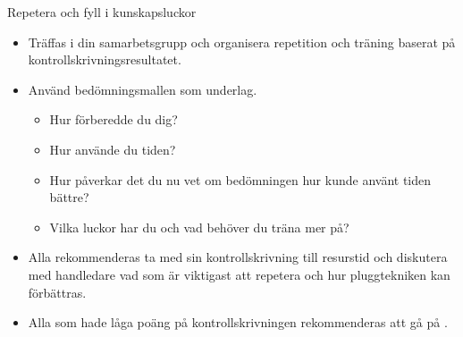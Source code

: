 \begin{Slide}{Repetera och fyll i kunskapsluckor}

\begin{itemize}
  \item
  Träffas i din samarbetsgrupp och organisera repetition och träning baserat på kontrollskrivningsresultatet.
    \item Använd bedömningsmallen som underlag.

  \begin{itemize}
    \item Hur förberedde du dig?
    \item Hur använde du tiden?
    \item Hur påverkar det du nu vet om bedömningen hur kunde använt tiden bättre?
    \item Vilka luckor har du och vad behöver du träna mer på?
  \end{itemize}
  
    
    \item Alla rekommenderas ta med sin kontrollskrivning till resurstid och diskutera med handledare vad som är viktigast att repetera och hur pluggtekniken kan förbättras. 
    \item Alla som hade låga poäng på kontrollskrivningen rekommenderas att gå på .
\end{itemize}


\end{Slide}

